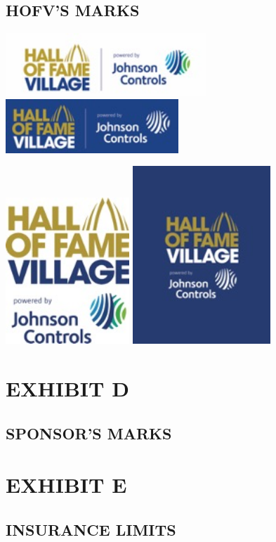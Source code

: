 \documentclass{article}
\begin{document}
\hypertarget{hofvs-marks}{%
\subsection{HOFV'S MARKS}\label{hofvs-marks}}

\includegraphics[width=2.98958in,height=0.92708in]{../assets/hofvbannera.jpg}
\includegraphics[width=2.5625in,height=0.80208in]{../assets/hofvbannerb.jpg}

\includegraphics[width=1.83333in,height=2.16667in]{../assets/hofvpostera.jpg}
\includegraphics[width=2.04167in,height=2.63542in]{../assets/hofvposterb.jpg}

\clearpage

\section{EXHIBIT D}
\subsection{SPONSOR'S MARKS}

\newpage

\section{EXHIBIT E}
\subsection{INSURANCE LIMITS}
\end{document}

